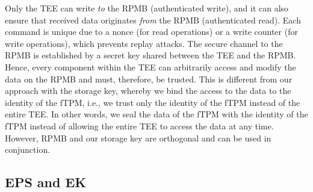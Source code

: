 Only the \ac{TEE} can write \emph{to} the RPMB (authenticated write), and it can also ensure that received data originates \emph{from} the RPMB (authenticated read).
Each command is unique due to a nonce (for read operations) or a write counter (for write operations), which prevents replay attacks.
The secure channel to the RPMB is established by a secret key shared between the TEE and the RPMB\@.
Hence, every component within the TEE can arbitrarily access and modify the data on the RPMB and must, therefore, be trusted.
This is different from our approach with the storage key, whereby we bind the access to the data to the identity of the fTPM, i.e., we trust only the identity of the fTPM instead of the entire TEE\@.
In other words, we seal the data of the fTPM with the identity of the fTPM instead of allowing the entire TEE to access the data at any time.
However, RPMB and our storage key are orthogonal and can be used in conjunction.




\subsection{EPS and EK}


